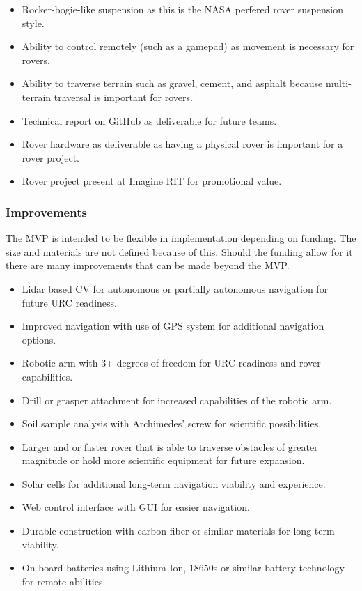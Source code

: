 \documentclass[conference]{IEEEtran} %
\begin{document}
\begin{itemize}
  \item Rocker-bogie-like suspension as this is the NASA perfered rover suspension style. 
  \item Ability to control remotely (such as a gamepad) as movement is necessary for rovers.
  \item Ability to traverse terrain such as gravel, cement, and asphalt because multi-terrain traversal is important for rovers. 
  \item Technical report on GitHub as deliverable for future teams.
  \item Rover hardware as deliverable as having a physical rover is important for a rover project. 
  \item Rover project present at Imagine RIT for promotional value.
\end{itemize}

\subsubsection{Improvements}
\label{improvements}

  The MVP is intended to be flexible in implementation depending on funding. The size and materials are not defined because of this. Should the funding allow for it there are many improvements that can be made beyond the MVP. 

\begin{itemize}
  \item Lidar based CV for autonomous or partially autonomous navigation for future URC readiness. 
  \item Improved navigation with use of GPS system for additional navigation options. 
  \item Robotic arm with 3+ degrees of freedom for URC readiness and rover capabilities. 
  \item Drill or grasper attachment for increased  capabilities  of the robotic arm.
  \item Soil sample analysis with Archimedes' screw for scientific possibilities. 
  \item Larger and or faster rover that is able to traverse obstacles of greater magnitude or hold more scientific equipment for future expansion. %
  \item Solar cells for additional long-term navigation viability and experience. 
  \item Web control interface with GUI for easier navigation. 
  \item Durable construction with carbon fiber or similar materials for long term viability.
  \item On board batteries using Lithium Ion, 18650s or similar battery technology for remote abilities.
\end{itemize}
\end{document}
